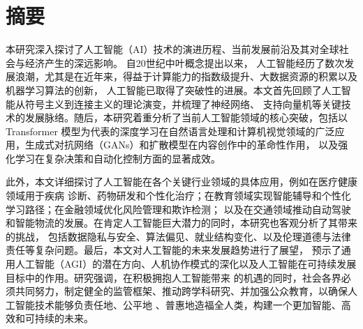 \section*{摘要}
本研究深入探讨了人工智能（AI）\cite{casal2023ai}技术的演进历程、当前发展前沿及其对全球社会与经济产生的深远影响。
自20世纪中叶概念提出以来，
人工智能经历了数次发展浪潮，尤其是在近年来，得益于计算能力的指数级提升、大数据资源的积累以及机器学习算法的创新，
人工智能已取得了突破性的进展。本文首先回顾了人工智能从符号主义到连接主义的理论演变，并梳理了神经网络、
支持向量机等关键技术的发展脉络。随后，本研究着重分析了当前人工智能领域的核心突破，包括以Transformer
模型为代表的深度学习在自然语言处理和计算机视觉领域的广泛应用，生成式对抗网络（GANs）和扩散模型在内容创作中的革命性作用，
以及强化学习在复杂决策和自动化控制方面的显著成效。

此外，本文详细探讨了人工智能在各个关键行业领域的具体应用，例如在医疗健康领域用于疾病
诊断、药物研发和个性化治疗；在教育领域实现智能辅导和个性化学习路径；在金融领域优化风险管理和欺诈检测；
以及在交通领域推动自动驾驶和智能物流的发展。在肯定人工智能巨大潜力的同时，本研究也客观分析了其带来的挑战，
包括数据隐私与安全、算法偏见、就业结构变化、以及伦理道德与法律责任等复杂问题。最后，本文对人工智能的未来发展趋势进行了展望，
预示了通用人工智能（AGI）的潜在方向、人机协作模式的深化以及人工智能在可持续发展目标中的作用。研究强调，在积极拥抱人工智能带来
的机遇的同时，社会各界必须共同努力，制定健全的监管框架、推动跨学科研究、并加强公众教育，以确保人工智能技术能够负责任地、公平地
、普惠地造福全人类，构建一个更加智能、高效和可持续的未来。 